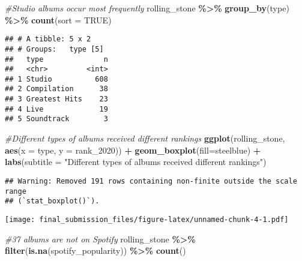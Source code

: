 \documentclass[
]{article}
\newenvironment{Shaded}{\begin{snugshade}}{\end{snugshade}}
\newcommand{\AttributeTok}[1]{\textcolor[rgb]{0.13,0.29,0.53}{#1}}
\newcommand{\CommentTok}[1]{\textcolor[rgb]{0.56,0.35,0.01}{\textit{#1}}}
\newcommand{\ConstantTok}[1]{\textcolor[rgb]{0.56,0.35,0.01}{#1}}
\newcommand{\FunctionTok}[1]{\textcolor[rgb]{0.13,0.29,0.53}{\textbf{#1}}}
\newcommand{\NormalTok}[1]{#1}
\newcommand{\SpecialCharTok}[1]{\textcolor[rgb]{0.81,0.36,0.00}{\textbf{#1}}}
\newcommand{\StringTok}[1]{\textcolor[rgb]{0.31,0.60,0.02}{#1}}
\begin{document}
\begin{Shaded}
\begin{Highlighting}[]
\CommentTok{\#Studio albums occur most frequently}
\NormalTok{rolling\_stone }\SpecialCharTok{\%\textgreater{}\%}
  \FunctionTok{group\_by}\NormalTok{(type) }\SpecialCharTok{\%\textgreater{}\%}
  \FunctionTok{count}\NormalTok{(}\AttributeTok{sort =} \ConstantTok{TRUE}\NormalTok{)}
\end{Highlighting}
\end{Shaded}

\begin{verbatim}
## # A tibble: 5 x 2
## # Groups:   type [5]
##   type              n
##   <chr>         <int>
## 1 Studio          608
## 2 Compilation      38
## 3 Greatest Hits    23
## 4 Live             19
## 5 Soundtrack        3
\end{verbatim}

\begin{Shaded}
\begin{Highlighting}[]
\CommentTok{\#Different types of albums received different rankings}
\FunctionTok{ggplot}\NormalTok{(rolling\_stone, }\FunctionTok{aes}\NormalTok{(}\AttributeTok{x =}\NormalTok{ type, }\AttributeTok{y =}\NormalTok{ rank\_2020)) }\SpecialCharTok{+}
  \FunctionTok{geom\_boxplot}\NormalTok{(}\AttributeTok{fill=}\StringTok{\textquotesingle{}steelblue\textquotesingle{}}\NormalTok{) }\SpecialCharTok{+}
  \FunctionTok{labs}\NormalTok{(}\AttributeTok{subtitle =} \StringTok{"Different types of albums received different rankings"}\NormalTok{)}
\end{Highlighting}
\end{Shaded}

\begin{verbatim}
## Warning: Removed 191 rows containing non-finite outside the scale range
## (`stat_boxplot()`).
\end{verbatim}

\texttt{[image: final\_submission\_files/figure-latex/unnamed-chunk-4-1.pdf]}

\begin{Shaded}
\begin{Highlighting}[]
\CommentTok{\#37 albums are not on Spotify}
\NormalTok{rolling\_stone }\SpecialCharTok{\%\textgreater{}\%}
  \FunctionTok{filter}\NormalTok{(}\FunctionTok{is.na}\NormalTok{(spotify\_popularity)) }\SpecialCharTok{\%\textgreater{}\%}
  \FunctionTok{count}\NormalTok{()}
\end{Highlighting}
\end{Shaded}
\end{document}
